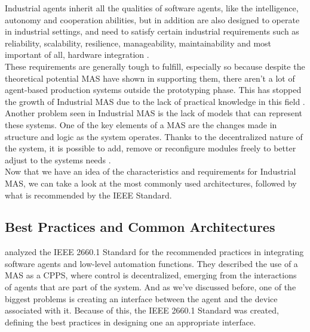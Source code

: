 Industrial agents inherit all the qualities of software agents, like the intelligence, autonomy and cooperation abilities, but in addition are also designed to operate in industrial settings, and need to satisfy certain industrial requirements such as reliability, scalability, resilience, manageability, maintainability and most important of all, hardware integration \cite{Leitao2021}.\\

These requirements are generally tough to fulfill, especially so because despite the theoretical potential MAS have shown in supporting them, there aren't a lot of agent-based production systems outside the prototyping phase. This has stopped the growth of Industrial MAS due to the lack of practical knowledge in this field \cite{Karnouskos2019}. Another problem seen in Industrial MAS is the lack of models that can represent these systems. One of the key elements of a MAS are the changes made in structure and logic as the system operates. Thanks to the decentralized nature of the system, it is possible to add, remove or reconfigure modules freely to better adjust to the systems needs \cite{Karnouskos2019}.\\

Now that we have an idea of the characteristics and requirements for Industrial MAS, we can take a look at the most commonly used architectures, followed by what is recommended by the IEEE Standard.

\subsection{Best Practices and Common Architectures}
\label{subsec:best_practices_and_common_architectures}

\citeauthor{Leitao2021} \cite{Leitao2021} analyzed the IEEE 2660.1 Standard for the recommended practices in integrating software agents and low-level automation functions. They described the use of a MAS as a CPPS, where control is decentralized, emerging from the interactions of agents that are part of the system. And as we've discussed before, one of the biggest problems is creating an interface between the agent and the device associated with it. Because of this, the IEEE 2660.1 Standard was created, defining the best practices in designing one an appropriate interface.\\

